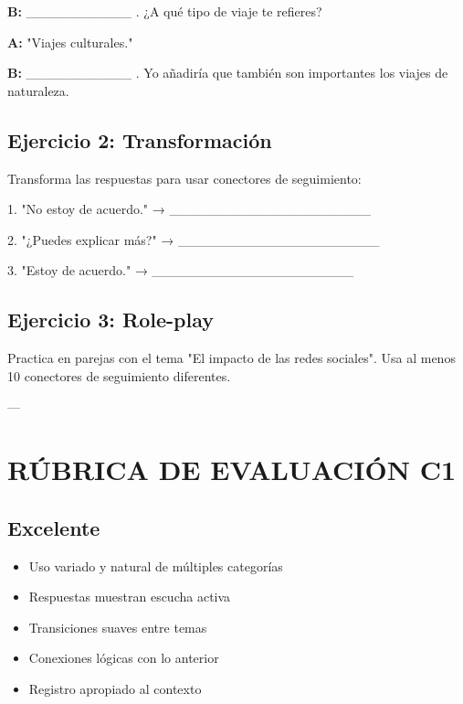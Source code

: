 \documentclass[a4paper,11pt]{article}
\begin{document}
\textbf{B:} ___________ . ¿A qué tipo de viaje te refieres?

\textbf{A:} "Viajes culturales."

\textbf{B:} ___________ . Yo añadiría que también son importantes los viajes de naturaleza.

\vspace{0.2cm}

\subsection{Ejercicio 2: Transformación}

Transforma las respuestas para usar conectores de seguimiento:

\vspace{0.2cm}

1. "No estoy de acuerdo." → _____________________

2. "¿Puedes explicar más?" → _____________________

3. "Estoy de acuerdo." → _____________________

\vspace{0.2cm}

\subsection{Ejercicio 3: Role-play}

Practica en parejas con el tema "El impacto de las redes sociales". Usa al menos 10 conectores de seguimiento diferentes.

\vspace{0.2cm}

---

\vspace{0.2cm}

\section{RÚBRICA DE EVALUACIÓN C1}

\vspace{0.2cm}

\subsection{Excelente}

\begin{itemize}

  \item Uso variado y natural de múltiples categorías

  \item Respuestas muestran escucha activa

  \item Transiciones suaves entre temas

  \item Conexiones lógicas con lo anterior

  \item Registro apropiado al contexto

\end{itemize}
\end{document}
